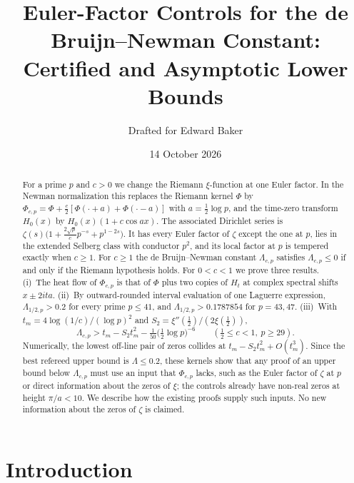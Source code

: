 \documentclass[11pt]{article}
\title{Euler-Factor Controls for the de Bruijn--Newman Constant:\protect\\
Certified and Asymptotic Lower Bounds}
\author{Drafted for Edward Baker}
\date{14 October 2026}
\numberwithin{equation}{section}
\theoremstyle{definition}
\theoremstyle{remark}
\begin{document}
\maketitle

\begin{abstract}
For a prime $p$ and $c>0$ we change the Riemann $\xi$-function at one
Euler factor. In the Newman normalization this replaces the Riemann kernel
$\Phi$ by $\Phi_{c,p}=\Phi+\tfrac c2[\Phi(\cdot+a)+\Phi(\cdot-a)]$ with
$a=\tfrac12\log p$, and the time-zero transform $H_0(x)$ by
$H_0(x)(1+c\cos ax)$. The associated Dirichlet series is
$\zeta(s)\bigl(1+\tfrac{2\sqrt p}{c}p^{-s}+p^{1-2s}\bigr)$. It has every
Euler factor of $\zeta$ except the one at $p$, lies in the extended Selberg
class with conductor $p^2$, and its local factor at $p$ is tempered exactly
when $c\ge1$. For $c\ge1$ the de Bruijn--Newman constant $\Lambda_{c,p}$
satisfies $\Lambda_{c,p}\le0$ if and only if the Riemann hypothesis holds.
For $0<c<1$ we prove three results.
(i)~The heat flow of $\Phi_{c,p}$ is that of $\Phi$ plus two copies of
$H_t$ at complex spectral shifts $x\pm2ita$.
(ii)~By outward-rounded interval evaluation of one Laguerre expression,
$\Lambda_{1/2,p}>0.2$ for every prime $p\le41$, and
$\Lambda_{1/2,p}>0.1787854$ for $p=43,47$.
(iii)~With $t_m=4\log(1/c)/(\log p)^2$ and
$S_2=\xi''(\tfrac12)/(2\xi(\tfrac12))$,
\[
\Lambda_{c,p}>t_m-S_2t_m^2-\tfrac1{50}\bigl(\tfrac12\log p\bigr)^{-6}
\qquad(\tfrac12\le c<1,\ p\ge29).
\]
Numerically, the lowest off-line pair of zeros collides at
$t_m-S_2t_m^2+O(t_m^3)$. Since the best refereed upper bound is
$\Lambda\le0.2$, these kernels show that any proof of an upper bound
below $\Lambda_{c,p}$ must use an input that $\Phi_{c,p}$ lacks, such as
the Euler factor of $\zeta$ at $p$ or direct information about the zeros of
$\xi$; the controls already have non-real zeros at height $\pi/a<10$. We
describe how the existing proofs supply such inputs. No new
information about the zeros of $\zeta$ is claimed.
\end{abstract}

\tableofcontents

\section{Introduction}\label{sec:intro}
\end{document}
